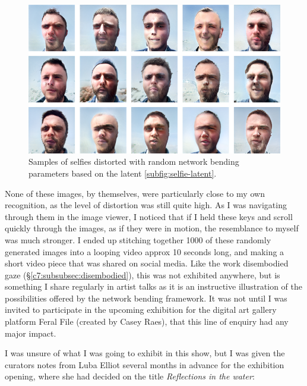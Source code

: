 \begin{figure}[!htb]
    \centering
    \captionsetup{justification=centering}
    \includegraphics[width=1\textwidth]{figures/c7_impact/selfie/selfie-series.png}
    \caption[Samples of selfies distorted with random network bending parameters]{ Samples of selfies distorted with random network bending parameters based on the latent \ref{subfig:selfie-latent}.}
    \label{fig:c7:selfie-series}
\end{figure}


None of these images, by themselves, were particularly close to my own recognition, as the level of distortion was still quite high.
As I was navigating through them in the image viewer, I noticed that if I held these keys and scroll quickly through the images, as if they were in motion, the resemblance to myself was much stronger. 
I ended up stitching together 1000 of these randomly generated images into a looping video approx 10 seconds long, and making a short video piece that was shared on social media. 
Like the work disembodied gaze (\S \ref{c7:subsubsec:disembodied}), this was not exhibited anywhere, but is something I share regularly in artist talks as it is an instructive illustration of the possibilities offered by the network bending framework.
It was not until I was invited to participate in the upcoming exhibition for the digital art gallery platform Feral File (created by Casey Raes), that this line of enquiry had any major impact. 

I was unsure of what I was going to exhibit in this show, but I was given the curators notes from Luba Elliot several months in advance for the exhibition opening, where she had decided on the title \textit{Reflections in the water}:

